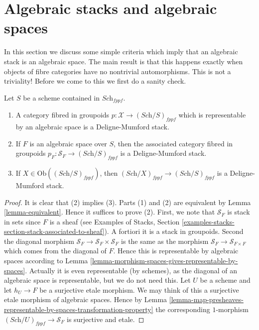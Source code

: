 \section{Algebraic stacks and algebraic spaces}
\label{section-stacks-spaces}

\noindent
In this section we discuss some simple criteria which imply that an
algebraic stack is an algebraic space. The main result is that this
happens exactly when objects of fibre categories have no nontrivial
automorphisms. This is not a triviality! Before we come to this
we first do a sanity check.

\begin{lemma}
\label{lemma-representable-algebraic}
Let $S$ be a scheme contained in $\textit{Sch}_{fppf}$.
\begin{enumerate}
\item A category fibred in groupoids
$p : \mathcal{X} \to (\textit{Sch}/S)_{fppf}$
which is representable by an algebraic space is a Deligne-Mumford stack.
\item If $F$ is an algebraic space over $S$, then the associated
category fibred in groupoids
$p_F : \mathcal{S}_F \to (\textit{Sch}/S)_{fppf}$
is a Deligne-Mumford stack.
\item If $X \in \text{Ob}((\textit{Sch}/S)_{fppf})$, then
$(\textit{Sch}/X)_{fppf} \to (\textit{Sch}/S)_{fppf}$ is
a Deligne-Mumford stack.
\end{enumerate}
\end{lemma}

\begin{proof}
It is clear that (2) implies (3).
Parts (1) and (2) are equivalent by Lemma \ref{lemma-equivalent}.
Hence it suffices to prove (2).
First, we note that $\mathcal{S}_F$ is stack in sets since
$F$ is a sheaf (see
Examples of Stacks,
Section \ref{examples-stacks-section-stack-associated-to-sheaf}).
A fortiori it is a stack in groupoids. Second the diagonal
morphism $\mathcal{S}_F \to \mathcal{S}_F  \times \mathcal{S}_F$
is the same as the morphism $\mathcal{S}_F \to \mathcal{S}_{F \times F}$
which comes from the diagonal of $F$. Hence this is representable
by algebraic spaces according to
Lemma \ref{lemma-morphism-spaces-gives-representable-by-spaces}.
Actually it is even representable (by schemes), as the diagonal of
an algebraic space is representable, but we do not need this.
Let $U$ be a scheme and let $h_U \to F$ be a surjective etale morphism.
We may think of this a surjective etale morphism of algebraic spaces.
Hence by
Lemma
\ref{lemma-map-presheaves-representable-by-spaces-transformation-property}
the corresponding $1$-morphism $(\textit{Sch}/U)_{fppf} \to \mathcal{S}_F$
is surjective and etale.
\end{proof}

